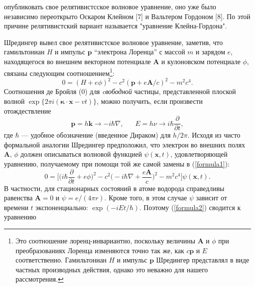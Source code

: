 \documentclass[a5paper, 10pt]{article}
\begin{document}
\pagestyle{fancy}
\setlength{\abovedisplayskip}{6pt}
\setlength{\abovedisplayshortskip}{6pt}
\setlength{\belowdisplayskip}{6pt}
\setlength{\belowdisplayshortskip}{6 pt}
\begin{flushleft}
опубликовать свое релятивистсское волновое уравнение, оно уже было независимо переоткрыто Оскаром Клейном [7] и Вальтером Гордоном [8]. По этой причине релятивистский вариант называется "уравнение Клейна-Гордона".
\end{flushleft}

Шредингер вывел свое релятивистское волновое уравнение, заметив, что гамильтониан $H$ и импульс $\textbf{p}$ ``электрона Лоренца'' с массой $m$ и зарядом $e$, находящегося во внешнем векторном потенциале $\textbf{A}$ и кулоновском потенциале $\phi$, связаны следующим соотношением\footnote{Это соотношение лоренц-инвариантно, поскольку величины $\textbf{A}$ и $\phi$ при преобразованиях Лоренца изменяются точно так же, как $c\textbf{p}$ и $E$ соответственно. Гамильтониан $H$ и импульс $\textbf{p}$ Шредингер представлял в виде частных производных действия, однако это неважно для нашего рассмотрения.}:
\begin{equation}
\label{formula1}
0 = (H+e\phi )^2-c^2(\textbf{p} +e\textbf{A} /c)^2-m^2c^4.
\end{equation}
Соотношения де Бройля (0) для \textit{cвободной} частицы, представленной плоской волной $\exp \{ 2 \pi i( \boldsymbol {\kappa} \cdot \textbf{x} -vt) \} $, можно получить, если произвести отождествление
\begin{equation}
\textbf{p} = h\textbf{k}\rightarrow -i\hbar\nabla,\;\;\;\;\;\; E=h\nu \rightarrow i\hbar \frac{\partial}{\partial t},
\end{equation}
где $\hbar$ — удобное обозначение (введенное Дираком) для $h/2 \pi$. Исходя из чисто формальной аналогии Шредингер предположил, что электрон во внешних полях $\textbf{A}$, $\phi$ должен описываться волновой функцией $\psi(\textbf{x},t)$, удовлетворяющей уравнению, получаемому при помощи той же самой замены в (\ref{formula1}):
\begin{equation}
\label{formula2}
0 = \biggl[\biggl(i\hbar \frac{\partial}{\partial t}+e\phi \biggr)^2 - c^2\biggl(-i\hbar \nabla +\frac{e \textbf{A}}{c}\biggr)^2-m^2c^4\biggr]\psi (\textbf {x},t).
\end{equation}
В частности, для стационарных состояний в атоме водорода справедливы равенства $\textbf{A} = 0$ и $\psi = e/(4\pi r)$. Кроме того, в этом случае $\psi$ зависит от времени $t$ экспоненциально: $\exp(-iEt/\hbar)$. Поэтому (\ref{formula2}) сводится к уравнению
\end{document}
